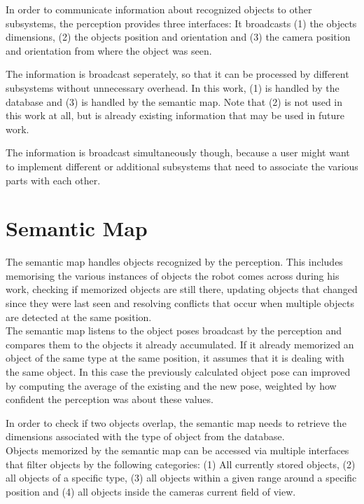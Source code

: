 In order to communicate information about recognized objects to other subsystems, the perception provides three interfaces: It broadcasts (1) the objects dimensions, (2) the objects position and orientation and (3) the camera position and orientation from where the object was seen.

The information is broadcast seperately, so that it can be processed by different subsystems without unnecessary overhead. In this work, (1) is handled by the database and (3) is handled by the semantic map. Note that (2) is not used in this work at all, but is already existing information that may be used in future work.

The information is broadcast simultaneously though, because a user might want to implement different or additional subsystems that need to associate the various parts with each other.

\section{Semantic Map}
The semantic map handles objects recognized by the perception. This includes memorising the various instances of objects the robot comes across during his work, checking if memorized objects are still there, updating objects that changed since they were last seen and resolving conflicts that occur when multiple objects are detected at the same position. \\

The semantic map listens to the object poses broadcast by the perception and compares them to the objects it already accumulated. If it already memorized an object of the same type at the same position, it assumes that it is dealing with the same object. In this case the previously calculated object pose can improved by computing the average of the existing and the new pose, weighted by how confident the perception was about these values.

In order to check if two objects overlap, the semantic map needs to retrieve the dimensions associated with the type of object from the database. \\

Objects memorized by the semantic map can be accessed via multiple interfaces that filter objects by the following categories: (1) All currently stored objects, (2) all objects of a specific type, (3) all objects within a given range around a specific position and (4) all objects inside the cameras current field of view.

